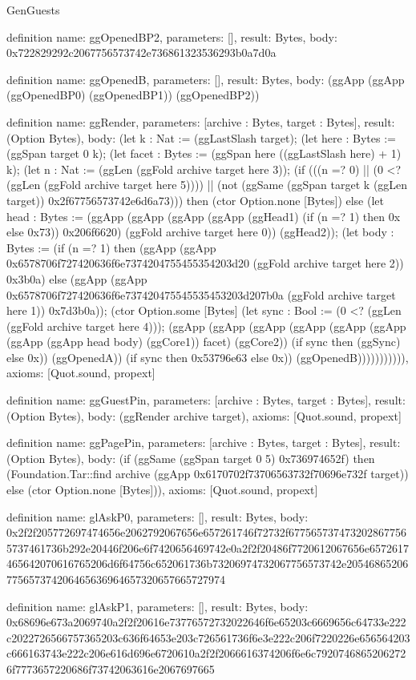 \begin{lexlean}{GenGuests}
\begin{semanticmodule}
definition{
  name: ggOpenedBP2,
  parameters: [],
  result: Bytes,
  body: 0x722829292c2067756573742e736861323536293b0a7d0a
}

definition{
  name: ggOpenedB,
  parameters: [],
  result: Bytes,
  body: (ggApp (ggApp (ggOpenedBP0) (ggOpenedBP1)) (ggOpenedBP2))
}

definition{
  name: ggRender,
  parameters: [archive : Bytes, target : Bytes],
  result: (Option Bytes),
  body: (let k : Nat := (ggLastSlash target); (let here : Bytes := (ggSpan target 0 k); (let facet : Bytes := (ggSpan here ((ggLastSlash here) + 1) k); (let n : Nat := (ggLen (ggFold archive target here 3)); (if (((n =? 0) || (0 <? (ggLen (ggFold archive target here 5)))) || (not (ggSame (ggSpan target k (ggLen target)) 0x2f67756573742e6d6a73))) then (ctor Option.none [Bytes]) else (let head : Bytes := (ggApp (ggApp (ggApp (ggApp (ggHead1) (if (n =? 1) then 0x else 0x73)) 0x206f6620) (ggFold archive target here 0)) (ggHead2)); (let body : Bytes := (if (n =? 1) then (ggApp (ggApp 0x6578706f727420636f6e7374204755455354203d20 (ggFold archive target here 2)) 0x3b0a) else (ggApp (ggApp 0x6578706f727420636f6e737420475545535453203d207b0a (ggFold archive target here 1)) 0x7d3b0a)); (ctor Option.some [Bytes] (let sync : Bool := (0 <? (ggLen (ggFold archive target here 4))); (ggApp (ggApp (ggApp (ggApp (ggApp (ggApp (ggApp (ggApp head body) (ggCore1)) facet) (ggCore2)) (if sync then (ggSync) else 0x)) (ggOpenedA)) (if sync then 0x53796e63 else 0x)) (ggOpenedB))))))))))),
  axioms: [Quot.sound, propext]
}

definition{
  name: ggGuestPin,
  parameters: [archive : Bytes, target : Bytes],
  result: (Option Bytes),
  body: (ggRender archive target),
  axioms: [Quot.sound, propext]
}

definition{
  name: ggPagePin,
  parameters: [archive : Bytes, target : Bytes],
  result: (Option Bytes),
  body: (if (ggSame (ggSpan target 0 5) 0x736974652f) then (Foundation.Tar::find archive (ggApp 0x6170702f73706563732f70696e732f target)) else (ctor Option.none [Bytes])),
  axioms: [Quot.sound, propext]
}

definition{
  name: glAskP0,
  parameters: [],
  result: Bytes,
  body: 0x2f2f205772697474656e2062792067656e657261746f72732f6775657374732028677565737461736b292e20446f206e6f7420656469742e0a2f2f20486f7720612067656e6572617465642070616765206d6f64756c652061736b73206974732067756573742e20546865206775657374206465636964657320657665727974
}

definition{
  name: glAskP1,
  parameters: [],
  result: Bytes,
  body: 0x68696e673a2069740a2f2f20616e73776572732022646f6e65203c6669656c64733e222c2022726566757365203c636f64653e203c726561736f6e3e222c206f7220226e656564203c666163743e222c206e616d696e6720610a2f2f2066616374206f6e6c79207468652062726f7773657220686f73742063616e2067697665
}


\end{semanticmodule}
\end{lexlean}
